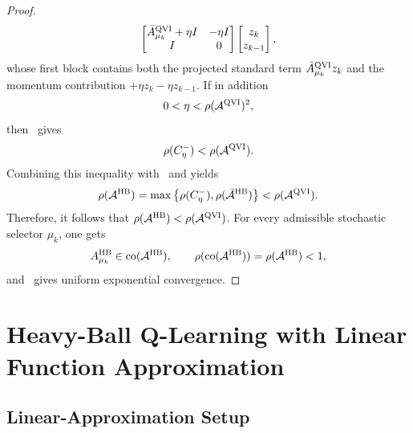 \documentclass[letterpaper]{article}
\numberwithin{equation}{section}
\newcommand{\co}{\operatorname{co}}
\begin{document}
\begin{proof}
\begin{align*}
\begin{bmatrix}
    \bar A_{\mu_k}^{\rm QVI}+\eta I&-\eta I\\
    I&0
  \end{bmatrix}
  \begin{bmatrix}z_k\\z_{k-1}\end{bmatrix},
\end{align*}
whose first block contains both the projected standard term
$\bar A_{\mu_k}^{\rm QVI}z_k$ and the momentum contribution
$+\eta z_k-\eta z_{k-1}$.
If in addition
\begin{align*}
  0<\eta<\rho(\mathcal A^{\rm QVI})^2,
\end{align*}
then~ gives
\begin{align*}
  \rho(C_\eta^-)<\rho(\mathcal A^{\rm QVI}).
\end{align*}
Combining this inequality with~ and
 yields
\begin{align*}
  \rho(\mathcal A^{\rm HB}) =\max\left\{\rho(C_\eta^-),\rho(\bar{\mathcal A}^{\rm HB})\right\}<\rho(\mathcal A^{\rm QVI}).
\end{align*}
Therefore, it follows that $\rho(\mathcal A^{\rm HB}) <\rho(\mathcal A^{\rm QVI})$.
For every admissible stochastic selector $\mu_k$, one gets
\begin{align*}
  A_{\mu_k}^{\rm HB}\in\co(\mathcal A^{\rm HB}),
  \qquad
  \rho(\co(\mathcal A^{\rm HB}))=\rho(\mathcal A^{\rm HB})<1,
\end{align*}
and~ gives uniform exponential convergence.
\end{proof}

\section{Heavy-Ball Q-Learning with Linear Function Approximation}
\label{app:hb-lfa}

\subsection{Linear-Approximation Setup}
\label{app:lfa-setup}
\end{document}
